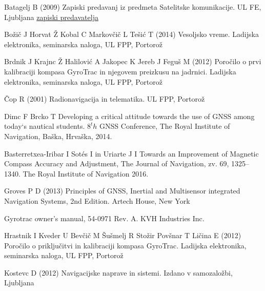 %
%
%
% 
% 
%
\begin{thebibliography}{99.}
%
%
%
 Batagelj B (2009) Zapiski predavanj iz predmeta Satelitske komunikacije. UL FE, Ljubljana \href{http://lso.fe.uni-lj.si/studij/sateliti/gradivo/01p_sk.pdf}{zapiski predavatelja}

 Božič J Horvat Ž Kobal C Markovčič L Tešić T (2014)  Vesoljsko vreme. Ladijska elektronika, seminarska naloga, UL FPP, Portorož %

 Brdnik J Krajnc Ž Halilović A Jakopec K Jereb J Feguš M (2012)  Poročilo o prvi kalibraciji kompasa GyroTrac in njegovem preizkusu na jadrnici. Ladijska elektronika, seminarska naloga, UL FPP, Portorož %

 Čop R (2001) Radionavigacija in telematika. UL FPP, Portorož %

 Dimc F Brcko T Developing a critical attitude towards the use of GNSS among today`s nautical students. $8^th$ GNSS Conference, The Royal Institute of Navigation, Baška, Hrvaška, 2014. %

 Basterretxea-Iribar I Sotés I in Uriarte J I Towards an Improvement of Magnetic Compass Accuracy and Adjustment, The Journal of Navigation, zv. 69, 1325–1340. The Royal Institute of Navigation 2016.

 Groves P D (2013) Principles of GNSS, Inertial and Multisensor integrated Navigation Systems, 2nd Edition. Artech House, New York %

 Gyrotrac owner's manual, 54-0971 Rev. A. KVH Industries Inc.   %

 Hrastnik I Kveder U Bevčič M Šušmelj R Stožir Povšnar T Ličina E (2012)  Poročilo o priključitvi in kalibraciji kompasa GyroTrac. Ladijska elektronika, seminarska naloga, UL FPP, Portorož %

 Kostevc D (2012) Navigacijske naprave in sistemi. Izdano v samozaložbi, Ljubljana


\end{thebibliography}
